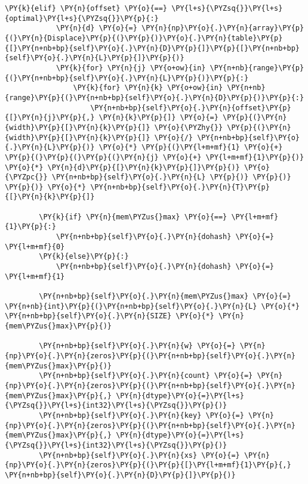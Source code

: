 \begin{Verbatim}[commandchars=\\\{\}]
        \PY{k}{elif} \PY{n}{offset} \PY{o}{==} \PY{l+s}{\PYZsq{}}\PY{l+s}{optimal}\PY{l+s}{\PYZsq{}}\PY{p}{:}
            \PY{n}{d} \PY{o}{=} \PY{n}{np}\PY{o}{.}\PY{n}{array}\PY{p}{(}\PY{n}{Displace}\PY{p}{(}\PY{p}{)}\PY{o}{.}\PY{n}{table}\PY{p}{[}\PY{n+nb+bp}{self}\PY{o}{.}\PY{n}{D}\PY{p}{]}\PY{p}{[}\PY{n+nb+bp}{self}\PY{o}{.}\PY{n}{L}\PY{p}{]}\PY{p}{)}
            \PY{k}{for} \PY{n}{j} \PY{o+ow}{in} \PY{n+nb}{range}\PY{p}{(}\PY{n+nb+bp}{self}\PY{o}{.}\PY{n}{L}\PY{p}{)}\PY{p}{:}
                \PY{k}{for} \PY{n}{k} \PY{o+ow}{in} \PY{n+nb}{range}\PY{p}{(}\PY{n+nb+bp}{self}\PY{o}{.}\PY{n}{D}\PY{p}{)}\PY{p}{:}
                    \PY{n+nb+bp}{self}\PY{o}{.}\PY{n}{offset}\PY{p}{[}\PY{n}{j}\PY{p}{,} \PY{n}{k}\PY{p}{]} \PY{o}{=} \PY{p}{(}\PY{n}{width}\PY{p}{[}\PY{n}{k}\PY{p}{]} \PY{o}{\PYZhy{}} \PY{p}{(}\PY{n}{width}\PY{p}{[}\PY{n}{k}\PY{p}{]} \PY{o}{/} \PY{n+nb+bp}{self}\PY{o}{.}\PY{n}{L}\PY{p}{)} \PY{o}{*} \PY{p}{(}\PY{l+m+mf}{1} \PY{o}{+} \PY{p}{(}\PY{p}{(}\PY{p}{(}\PY{n}{j} \PY{o}{+} \PY{l+m+mf}{1}\PY{p}{)} \PY{o}{*} \PY{n}{d}\PY{p}{[}\PY{n}{k}\PY{p}{]}\PY{p}{)} \PY{o}{\PYZpc{}} \PY{n+nb+bp}{self}\PY{o}{.}\PY{n}{L} \PY{p}{)} \PY{p}{)} \PY{p}{)} \PY{o}{*} \PY{n+nb+bp}{self}\PY{o}{.}\PY{n}{T}\PY{p}{[}\PY{n}{k}\PY{p}{]}
        
        \PY{k}{if} \PY{n}{mem\PYZus{}max} \PY{o}{==} \PY{l+m+mf}{1}\PY{p}{:}
            \PY{n+nb+bp}{self}\PY{o}{.}\PY{n}{dohash} \PY{o}{=} \PY{l+m+mf}{0}
        \PY{k}{else}\PY{p}{:}
            \PY{n+nb+bp}{self}\PY{o}{.}\PY{n}{dohash} \PY{o}{=} \PY{l+m+mf}{1}
        
        \PY{n+nb+bp}{self}\PY{o}{.}\PY{n}{mem\PYZus{}max} \PY{o}{=} \PY{n+nb}{int}\PY{p}{(}\PY{n+nb+bp}{self}\PY{o}{.}\PY{n}{L} \PY{o}{*} \PY{n+nb+bp}{self}\PY{o}{.}\PY{n}{SIZE} \PY{o}{*} \PY{n}{mem\PYZus{}max}\PY{p}{)}

        \PY{n+nb+bp}{self}\PY{o}{.}\PY{n}{w} \PY{o}{=} \PY{n}{np}\PY{o}{.}\PY{n}{zeros}\PY{p}{(}\PY{n+nb+bp}{self}\PY{o}{.}\PY{n}{mem\PYZus{}max}\PY{p}{)}
        \PY{n+nb+bp}{self}\PY{o}{.}\PY{n}{count} \PY{o}{=} \PY{n}{np}\PY{o}{.}\PY{n}{zeros}\PY{p}{(}\PY{n+nb+bp}{self}\PY{o}{.}\PY{n}{mem\PYZus{}max}\PY{p}{,} \PY{n}{dtype}\PY{o}{=}\PY{l+s}{\PYZsq{}}\PY{l+s}{int32}\PY{l+s}{\PYZsq{}}\PY{p}{)}
        \PY{n+nb+bp}{self}\PY{o}{.}\PY{n}{key} \PY{o}{=} \PY{n}{np}\PY{o}{.}\PY{n}{zeros}\PY{p}{(}\PY{n+nb+bp}{self}\PY{o}{.}\PY{n}{mem\PYZus{}max}\PY{p}{,} \PY{n}{dtype}\PY{o}{=}\PY{l+s}{\PYZsq{}}\PY{l+s}{int32}\PY{l+s}{\PYZsq{}}\PY{p}{)}
        \PY{n+nb+bp}{self}\PY{o}{.}\PY{n}{xs} \PY{o}{=} \PY{n}{np}\PY{o}{.}\PY{n}{zeros}\PY{p}{(}\PY{p}{[}\PY{l+m+mf}{1}\PY{p}{,} \PY{n+nb+bp}{self}\PY{o}{.}\PY{n}{D}\PY{p}{]}\PY{p}{)}


\end{Verbatim}
